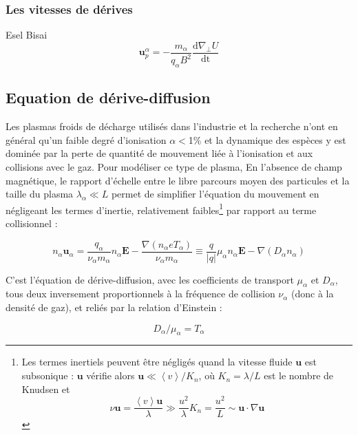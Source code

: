 \begin{refsection}
\subsubsection{Les vitesses de dérives}
\parencite{Garcia}Esel
\parencite{Bisai}Bisai
\label{vitessesDerive}
\begin{equation}
\label{1-vitessePol}
\mathbf{u}_p^\alpha=-\frac{m_\alpha}{q_\alpha B^2}\frac{\text{d}\nabla_\perp
U}{\text{dt}}
\end{equation}

\subsection{Equation de dérive-diffusion}
\label{1-transportAmbipolaire}
Les plasmas froids de décharge utilisés dans l'industrie et la recherche n'ont
en général qu'un faible degré d'ionisation $\alpha<$1\% et la dynamique des
espèces y est dominée par la perte de quantité de mouvement liée à l'ionisation
et aux collisions avec le gaz. Pour modéliser ce type de plasma, En l'absence de champ magnétique, le
rapport d'échelle entre le libre parcours moyen des particules et la taille du
plasma $\lambda_\alpha\ll L$ permet de simplifier l'équation du mouvement en
négligeant les termes d'inertie, relativement faibles\footnote{Les termes
inertiels peuvent être négligés quand la vitesse fluide $\mathbf u$ est
subsonique : $\mathbf u$ vérifie alors $\mathbf u\ll \left<v\right>/K_n$, où
$K_n=\lambda/L$ est le nombre de Knudsen et $$\nu \mathbf u=\frac{
\left<v\right>\mathbf u}{\lambda}\gg \frac{u^2}{\lambda}K_n=\frac{u^2}{L}\sim
\mathbf u\cdot\nabla\mathbf u$$} par rapport au terme collisionnel :

\begin{equation}
\label{1-eqDriftDif}
n_\alpha\mathbf u_\alpha=\frac{q_\alpha}{\nu_\alpha m_\alpha}n_\alpha\mathbf
E-\frac{\nabla\left(n_\alpha eT_\alpha\right)}{\nu_\alpha
m_\alpha}\equiv\frac{q}{|q|}\mu_\alpha n_\alpha\mathbf E-{\nabla\left(D_\alpha n_\alpha\right)}
\end{equation}

C'est l'équation de dérive-diffusion, avec les coefficients de
transport $\mu_\alpha$ et $D_\alpha$, tous deux
inversement proportionnels à la fréquence de collision $\nu_\alpha$ (donc à la
densité de gaz), et reliés par la relation d'Einstein :

\begin{equation}
\label{1-EinsteinRelation}
D_\alpha/\mu_\alpha=T_\alpha
\end{equation}


\end{refsection}
